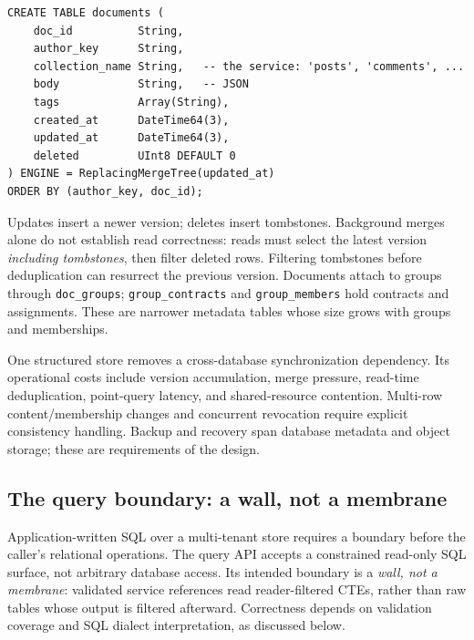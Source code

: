 \documentclass[sigconf, nonacm]{acmart}
\begin{document}
\begin{center}
\begin{minipage}{\columnwidth}
\begin{lstlisting}[style=sql]
CREATE TABLE documents (
    doc_id          String,
    author_key      String,
    collection_name String,   -- the service: 'posts', 'comments', ...
    body            String,   -- JSON
    tags            Array(String),
    created_at      DateTime64(3),
    updated_at      DateTime64(3),
    deleted         UInt8 DEFAULT 0
) ENGINE = ReplacingMergeTree(updated_at)
ORDER BY (author_key, doc_id);
\end{lstlisting}
\end{minipage}
\end{center}

Updates insert a newer version; deletes insert tombstones. Background merges
alone do not establish read correctness: reads must select the latest version
\emph{including tombstones}, then filter deleted rows. Filtering tombstones
before deduplication can resurrect the previous version. Documents attach to
groups through \texttt{doc\_groups}; \texttt{group\_contracts} and
\texttt{group\_members} hold contracts and assignments. These are narrower
metadata tables whose size grows with groups and memberships.

One structured store removes a cross-database synchronization dependency.
Its operational costs include version accumulation, merge pressure, read-time
deduplication, point-query latency, and shared-resource contention. Multi-row
content/membership changes and concurrent revocation require explicit
consistency handling. Backup and recovery span database metadata and object
storage; these are requirements of the design.

\subsection{The query boundary: a wall, not a membrane}

Application-written SQL over a multi-tenant store requires a boundary before
the caller's relational operations. The query API accepts a constrained
read-only SQL surface, not arbitrary database access. Its intended boundary is
a \emph{wall, not a membrane}: validated service references read reader-filtered
CTEs, rather than raw tables whose output is filtered afterward. Correctness
depends on validation coverage and SQL dialect interpretation, as discussed below.
\end{document}
